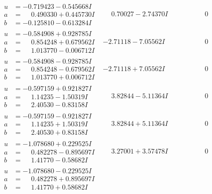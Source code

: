 \documentclass[1p]{elsarticle_modified}
\theoremstyle{definition}
\begin{document}
$$\begin{array}{c|c|c}
\begin{aligned}
u &= -0.719423 - 0.545668 I \\
a &= \phantom{-}0.490330 + 0.445730 I \\
b &= -0.125810 - 0.613284 I\end{aligned}
 & \phantom{-}0.70027 - 2.74370 I & \phantom{-0.000000 } 0 \\ \hline\begin{aligned}
u &= -0.584908 + 0.928785 I \\
a &= \phantom{-}0.854248 + 0.679562 I \\
b &= \phantom{-}1.013770 - 0.006712 I\end{aligned}
 & -2.71118 - 7.05562 I & \phantom{-0.000000 } 0 \\ \hline\begin{aligned}
u &= -0.584908 - 0.928785 I \\
a &= \phantom{-}0.854248 - 0.679562 I \\
b &= \phantom{-}1.013770 + 0.006712 I\end{aligned}
 & -2.71118 + 7.05562 I & \phantom{-0.000000 } 0 \\ \hline\begin{aligned}
u &= -0.597159 + 0.921827 I \\
a &= \phantom{-}1.14235 - 1.50319 I \\
b &= \phantom{-}2.40530 - 0.83158 I\end{aligned}
 & \phantom{-}3.82844 - 5.11364 I & \phantom{-0.000000 } 0 \\ \hline\begin{aligned}
u &= -0.597159 - 0.921827 I \\
a &= \phantom{-}1.14235 + 1.50319 I \\
b &= \phantom{-}2.40530 + 0.83158 I\end{aligned}
 & \phantom{-}3.82844 + 5.11364 I & \phantom{-0.000000 } 0 \\ \hline\begin{aligned}
u &= -1.078680 + 0.229525 I \\
a &= \phantom{-}0.482278 - 0.895697 I \\
b &= \phantom{-}1.41770 - 0.58682 I\end{aligned}
 & \phantom{-}3.27001 + 3.57478 I & \phantom{-0.000000 } 0 \\ \hline\begin{aligned}
u &= -1.078680 - 0.229525 I \\
a &= \phantom{-}0.482278 + 0.895697 I \\
b &= \phantom{-}1.41770 + 0.58682 I\end{aligned}

\end{array}$$
\end{document}
